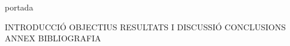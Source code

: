 \documentclass{article}
\begin{document}
\frontmatter
{portada}
\tableofcontents
\newpage

\listoffigures
\listoftables

\newpage


{INTRODUCCIÓ}
{OBJECTIUS}
{RESULTATS I DISCUSSIÓ}
{CONCLUSIONS}
{ANNEX}
{BIBLIOGRAFIA}
\end{document}
